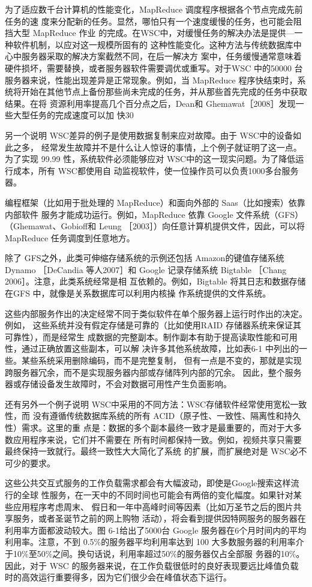 为了适应数千台计算机的性能变化，MapReduce 调度程序根据各个节点完成先前任务的速
度来分配新的任务。显然，哪怕只有一个速度缓慢的任务，也可能会阻挡大型 MapReduce 作业
的完成。在WSC中，对缓慢任务的解决办法是提供—一种软件机制，以应对这一规模所固有的
这种性能变化。这种方法与传统数据库中心中服务器采取的解决方案截然不同，在后一解决方
案中，任务缓慢通常意味着硬件损坏，需要替换，或者服务器软件需要调优或重写。对于WSC
中的50000 台服务器来说，性能出现差异是正常现象。例如，当 MapReduce 程序快结束时，系
统将开始在其他节点上备份那些尚未完成的任务，并从那些首先完成的任务中获取结果。在将
资源利用率提高几个百分点之后，Dean和 Ghemawat［2008］发现一些大型任务的完成速度可以加
快30%

另一个说明 WSC差异的例子是使用数据复制来应对故障。由于 WSC中的设备如此之多，
经常发生故障并不是什么让人惊讶的事情，上个例子就证明了这一点。为了实现 99.99%
性，系统软件必须能够应对 WSC中的这一现实问题。为了降低运行成本，所有 WSC都使用自
动监视软件，使一位操作员可以负责1000多台服务器。

编程框架（比如用于批处理的 MapReduce）和面向外部的 Saas（比如搜索）依靠内部软件
服务才能成功运行。例如，MapReduce 依靠 Google 文件系统（GFS）（Ghemawat、Gobioff和
Leung ［2003］）向任意计算机提供文件，因此，可以将 MapReduce 任务调度到任意地方。

除了 GFS之外，此类可伸缩存储系统的示例还包括 Amazon的键值存储系统 Dynamo
［DeCandia 等人2007］和 Google 记录存储系统 Bigtable ［Chang 2006］。注意，此类系统经常是相
互依赖的。例如，Bigtable 将其日志和数据存储在GFS 中，就像是关系数据库可以利用内核操
作系统提供的文件系统。

这些内部服务作出的决定经常不同于类似软件在单个服务器上运行时作出的决定。例如，
这些系统并没有假定存储是可靠的（比如使用RAID 存储器系统来保证其可靠性），而是经常生
成数据的完整副本。制作副本有助于提高读取性能和可用性，通过正确放置这些副本，可以解
决许多其他系统故障，比如表6-1 中列出的一些。某些系统采用删除编码，而不是完整复制，
但有一点是不变的，那就是实现跨服务器冗余，而不是实现服务器内部或存储阵列内部的冗余。
因此，整个服务器或存储设备发生故障时，不会对数据可用性产生负面影响。

还有另外一个例子说明 WSC中采用的不同方法：WSC存储软件经常使用宽松一致性，而
没有遵循传统数据库系统的所有 ACID（原子性、一致性、隔离性和持久性）需求。这里的重
点是：数据的多个副本最终一致才是最重要的，而对于大多数应用程序来说，它们并不需要在
所有时间都保持一致。例如，视频共享只需要最终保持一致就行。最终一致性大大简化了系统
的扩展，而扩展绝对是 WSC必不可少的要求。

这些公共交互式服务的工作负载需求都会有大幅波动，即使是Google搜索这样流行的全球
性服务，在一天中的不同时间也可能会有两倍的变化幅度。如果针对某些应用程序考虑周末、
假日和一年中高峰时间等因素（比如万圣节之后的图片共享服务，或者圣诞节之前的网上购物
活动），将会看到提供因特网服务的服务器在利用率方面都波动较大。图 6-1给出了5000台
Google 服务器在6个月时间内的平均利用率。注意，不到 0.5\%的服务器平均利用率达到 100%
大多数服务器的利用率介于10\%至50\%之间。换句话说，利用率超过50\%的服务器仅占全部服
务器的10\%。因此，对于 WSC 的服务器来说，在工作负载很低时的良好表现要远比峰值负载
时的高效运行重要得多，因为它们很少会在峰值状态下运行。


